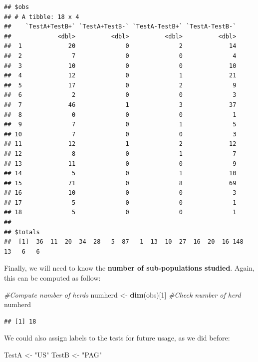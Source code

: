 \documentclass[
]{book}
\newenvironment{Shaded}{\begin{snugshade}}{\end{snugshade}}
\newcommand{\CommentTok}[1]{\textcolor[rgb]{0.56,0.35,0.01}{\textit{#1}}}
\newcommand{\DecValTok}[1]{\textcolor[rgb]{0.00,0.00,0.81}{#1}}
\newcommand{\FunctionTok}[1]{\textcolor[rgb]{0.13,0.29,0.53}{\textbf{#1}}}
\newcommand{\NormalTok}[1]{#1}
\newcommand{\OtherTok}[1]{\textcolor[rgb]{0.56,0.35,0.01}{#1}}
\newcommand{\StringTok}[1]{\textcolor[rgb]{0.31,0.60,0.02}{#1}}
\begin{document}
\begin{verbatim}
## $obs
## # A tibble: 18 x 4
##    `TestA+TestB+` `TestA+TestB-` `TestA-TestB+` `TestA-TestB-`
##             <dbl>          <dbl>          <dbl>          <dbl>
##  1             20              0              2             14
##  2              7              0              0              4
##  3             10              0              0             10
##  4             12              0              1             21
##  5             17              0              2              9
##  6              2              0              0              3
##  7             46              1              3             37
##  8              0              0              0              1
##  9              7              0              1              5
## 10              7              0              0              3
## 11             12              1              2             12
## 12              8              0              1              7
## 13             11              0              0              9
## 14              5              0              1             10
## 15             71              0              8             69
## 16             10              0              0              3
## 17              5              0              0              1
## 18              5              0              0              1
## 
## $totals
##  [1]  36  11  20  34  28   5  87   1  13  10  27  16  20  16 148  13   6   6
\end{verbatim}

Finally, we will need to know the \textbf{number of sub-populations studied}. Again, this can be computed as follow:

\begin{Shaded}
\begin{Highlighting}[]
\CommentTok{\#Compute number of herds}
\NormalTok{numherd }\OtherTok{\textless{}{-}} \FunctionTok{dim}\NormalTok{(obs)[}\DecValTok{1}\NormalTok{]}
\CommentTok{\#Check number of herd}
\NormalTok{numherd}
\end{Highlighting}
\end{Shaded}

\begin{verbatim}
## [1] 18
\end{verbatim}

We could also assign labels to the tests for future usage, as we did before:

\begin{Shaded}
\begin{Highlighting}[]
\NormalTok{TestA }\OtherTok{\textless{}{-}} \StringTok{"US"}
\NormalTok{TestB }\OtherTok{\textless{}{-}} \StringTok{"PAG"}
\end{Highlighting}
\end{Shaded}
\end{document}
